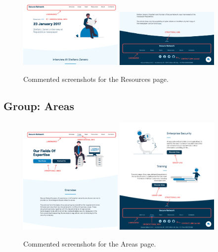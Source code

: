 \documentclass[12pt]{report}
\begin{document}
\begin{figure}[H]
	\centering
	\includegraphics[width=0.45\textwidth]{high_fid_wireframes/resource/1.png}
	\includegraphics[width=0.45\textwidth]{high_fid_wireframes/resource/2.png}
	\caption{Commented screenshots for the Resources page.}
\end{figure}

\subsection{Group: Areas}

\begin{figure}[H]
	\centering
	\includegraphics[width=0.45\textwidth]{high_fid_wireframes/all_areas/1.png}
	\includegraphics[width=0.45\textwidth]{high_fid_wireframes/all_areas/2.png}
	\caption{Commented screenshots for the Areas page.}
\end{figure}
\end{document}
